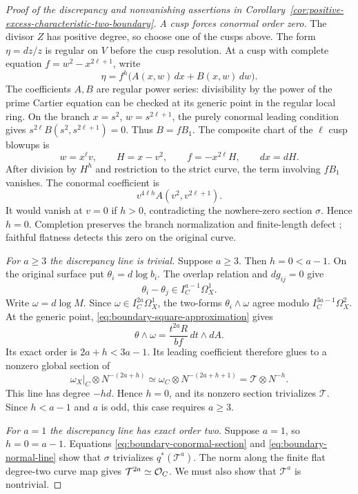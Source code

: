 \begin{proof}[Proof of the discrepancy and nonvanishing assertions in Corollary~\ref{cor:positive-excess-characteristic-two-boundary}]
\smallskip\noindent
\emph{A cusp forces conormal order zero.}
The divisor $Z$ has positive degree, so choose one of the cusps above.
The form $\eta=dz/z$ is regular on $V$ before the cusp resolution.
At a cusp with complete equation $f=w^2-x^{2\ell+1}$, write
\[
 \eta=f^h\bigl(A(x,w)\,dx+B(x,w)\,dw\bigr).
\]
The coefficients $A,B$ are regular power series: divisibility by
the power of the prime Cartier equation can be checked at its
generic point in the regular local ring. On the branch
$x=s^2$, $w=s^{2\ell+1}$, the purely conormal leading condition
gives $s^{2\ell}B(s^2,s^{2\ell+1})=0$. Thus $B=fB_1$.
The composite chart of the $\ell$ cusp blowups is
\[
 w=x^\ell v,\qquad H=x-v^2,\qquad
 f=-x^{2\ell}H,\qquad dx=dH.
\]
After division by $H^h$ and restriction to the strict curve,
the term involving $fB_1$ vanishes. The conormal coefficient is
\[
 v^{4\ell h}A(v^2,v^{2\ell+1}).
\]
It would vanish at $v=0$ if $h>0$, contradicting the nowhere-zero
section $\sigma$. Hence $h=0$. Completion preserves the branch
normalization and finite-length defect
\cite[Tags~0C1R and~0C3V]{Stacks}; faithful flatness detects this zero
on the original curve.

\smallskip\noindent
\emph{For $a\geq3$ the discrepancy line is trivial.}
Suppose $a\geq3$. Then $h=0<a-1$. On the original surface put
$\theta_i=d\log b_i$. The overlap relation and $dg_{ij}=0$
give
\[
 \theta_i-\theta_j\in I_C^{a-1}\Omega_X^1.
\]
Write $\omega=d\log M$. Since
$\omega\in I_C^{2a}\Omega_X^1$, the two-forms
$\theta_i\wedge\omega$ agree modulo
$I_C^{3a-1}\Omega_X^2$.
At the generic point, \eqref{eq:boundary-square-approximation}
gives
\[
 \theta\wedge\omega
   =\frac{t^{2a}R}{bf}\,dt\wedge dA.
\]
Its exact order is $2a+h<3a-1$. Its leading coefficient
therefore glues to a nonzero global section of
\[
 \omega_X|_C\otimes N^{-(2a+h)}
 \simeq\omega_C\otimes N^{-(2a+h+1)}
 =\mathcal T\otimes N^{-h}.
\]
This line has degree $-hd$. Hence $h=0$, and its nonzero
section trivializes $\mathcal T$. Since $h<a-1$ and $a$ is
odd, this case requires $a\geq3$.

\smallskip\noindent
\emph{For $a=1$ the discrepancy line has exact order two.}
Suppose $a=1$, so $h=0=a-1$. Equations
\eqref{eq:boundary-conormal-section} and
\eqref{eq:boundary-normal-line} show that $\sigma$ trivializes
$q^*(\mathcal T^a)$. The norm along the finite flat
degree-two curve map gives $\mathcal T^{2a}\simeq\mathcal O_C$.
We must also show that $\mathcal T^a$ is nontrivial.


\end{proof}
